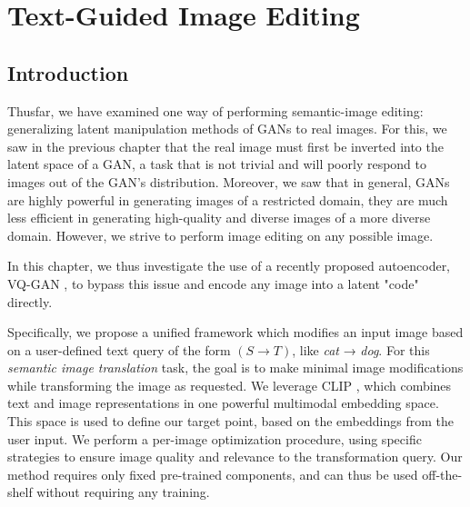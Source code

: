 \chapter{Text-Guided Image Editing}
\label{chapter:flexit}





\section{Introduction}

Thusfar, we have examined one way of performing semantic-image editing: 
generalizing latent manipulation methods of \ac{GAN}s to real images. For this, 
we saw in the previous chapter that the real image must first be inverted into 
the latent space of a \ac{GAN}, a task that is not trivial and will poorly respond to 
 images out of the \ac{GAN}'s distribution. Moreover, we saw that in general, \ac{GAN}s 
 are highly powerful in generating images of a restricted domain, they are much less 
 efficient in generating high-quality and diverse images of a more diverse domain. 
 However, we strive to perform image editing on any possible image. 
 
 In this chapter, 
 we thus investigate the use of a recently proposed autoencoder, VQ-GAN \citep{esser2021taming}, 
 to bypass this issue and encode any image into a latent "code" directly. 
 
Specifically, we propose  a unified framework which modifies an input image based
 on a user-defined text query of the form $(S \rightarrow T)$, like \textit{cat} → \textit{dog}.
  For this \textit{semantic image translation} task, the goal is to make minimal image
   modifications  while transforming the image as requested.
We leverage \ac{CLIP} \citep{radford2021learning},  which combines text and image representations in 
one powerful multimodal embedding space. This space is used to define our target point,
 based on the embeddings from the user input. We perform a per-image optimization 
 procedure, using specific  strategies to ensure image quality and relevance to the 
 transformation query. Our method requires only fixed pre-trained components, and can 
 thus be used off-the-shelf  without  requiring any training. 

